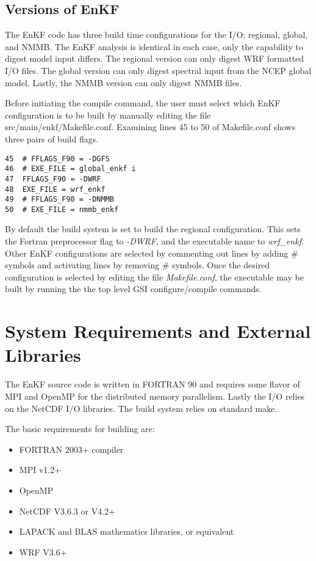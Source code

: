 \subsection{Versions of EnKF} \label{ch2_versions_enkf}

The EnKF code has three build time configurations for the I/O; regional, global, and NMMB. The EnKF analysis is identical in each case, only the capability to digest model input differs. The regional version can only digest WRF formatted I/O files. The global version can only digest spectral input from the NCEP global model. Lastly, the NMMB version can only digest NMMB files.

Before initiating the compile command, the user must select which EnKF configuration is to be built by manually editing the file src/main/enkf/Makefile.conf. Examining lines 45 to 50 of Makefile.conf shows three pairs of build flags.
\begin{verbatim}
45  # FFLAGS_F90 = -DGFS 
46  # EXE_FILE = global_enkf i
47  FFLAGS_F90 = -DWRF
48  EXE_FILE = wrf_enkf
49  # FFLAGS_F90 = -DNMMB 
50  # EXE_FILE = nmmb_enkf
\end{verbatim}

By default the build system is set to build the regional configuration. This sets the Fortran preprocessor flag to \textit{-DWRF}, and the executable name to \textit{wrf\_enkf}. Other EnKF configurations are selected by commenting out lines by adding \# symbols and activating lines by removing \# symbols. Once the desired configuration is selected by editing the file \textit{Makefile.conf}, the executable may be built by running the the top level GSI configure/compile commands.

\section{System Requirements and External Libraries} \label{ch2_system_requirements}

The EnKF source code is written in FORTRAN 90 and requires some flavor of MPI and OpenMP for the distributed memory parallelism. Lastly the I/O relies on the NetCDF I/O libraries. The build system relies on standard make.

The basic requirements for building are:
\begin{itemize}
\item FORTRAN 2003+ compiler
\item MPI v1.2+
\item OpenMP
\item NetCDF V3.6.3 or V4.2+
\item LAPACK and BLAS mathematics libraries, or equivalent 
\item WRF V3.6+
\end{itemize}

